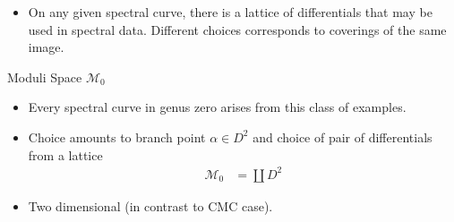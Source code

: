 \documentclass[xcolor=dvipsnames]{beamer}
\begin{document}
\begin{frame}
\begin{itemize}
\item On any given spectral curve, there is a lattice of differentials that may be used in spectral data. Different choices corresponds to coverings of the same image.
\end{itemize}
\end{frame}


\begin{frame}{Moduli Space $\mathcal{M}_0$}
\begin{itemize}
\item Every spectral curve in genus zero arises from this class of examples.
\item Choice amounts to branch point $α \in D^2$ and choice of pair of differentials from a lattice
\begin{align*}
  \mathcal{M}_0 &= \coprod D^2
\end{align*}
\item Two dimensional (in contrast to CMC case).
\end{itemize}
\end{frame}
\end{document}
